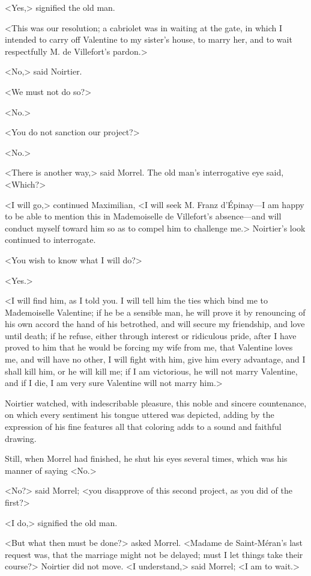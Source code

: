  <Yes,> signified the old man. 

 <This was our resolution; a cabriolet was in waiting at the gate, in which I intended to carry off Valentine to my sister's house, to marry her, and to wait respectfully M. de Villefort's pardon.> 

 <No,> said Noirtier. 

 <We must not do so?> 

 <No.> 

 <You do not sanction our project?> 

 <No.> 

 <There is another way,> said Morrel. The old man's interrogative eye said, <Which?> 

 <I will go,> continued Maximilian, <I will seek M. Franz d'Épinay—I am happy to be able to mention this in Mademoiselle de Villefort's absence—and will conduct myself toward him so as to compel him to challenge me.> Noirtier's look continued to interrogate. 

 <You wish to know what I will do?> 

 <Yes.> 

 <I will find him, as I told you. I will tell him the ties which bind me to Mademoiselle Valentine; if he be a sensible man, he will prove it by renouncing of his own accord the hand of his betrothed, and will secure my friendship, and love until death; if he refuse, either through interest or ridiculous pride, after I have proved to him that he would be forcing my wife from me, that Valentine loves me, and will have no other, I will fight with him, give him every advantage, and I shall kill him, or he will kill me; if I am victorious, he will not marry Valentine, and if I die, I am very sure Valentine will not marry him.> 

 Noirtier watched, with indescribable pleasure, this noble and sincere countenance, on which every sentiment his tongue uttered was depicted, adding by the expression of his fine features all that coloring adds to a sound and faithful drawing. 

 Still, when Morrel had finished, he shut his eyes several times, which was his manner of saying <No.> 

 <No?> said Morrel; <you disapprove of this second project, as you did of the first?> 

 <I do,> signified the old man. 

 <But what then must be done?> asked Morrel. <Madame de Saint-Méran's last request was, that the marriage might not be delayed; must I let things take their course?> Noirtier did not move. <I understand,> said Morrel; <I am to wait.> 

